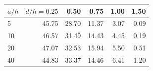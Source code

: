 \begin{tabularx}{\linewidth}{Xrrrrr}
\toprule
$a/h$ & $d/h=0.25$ & 0.50 & 0.75 & 1.00 & 1.50 \\
\midrule
5 & 45.75 & 28.70 & 11.37 & 3.07 & 0.09 \\
10 & 46.57 & 31.49 & 14.43 & 4.45 & 0.19 \\
20 & 47.07 & 32.53 & 15.94 & 5.50 & 0.51 \\
40 & 44.83 & 33.37 & 14.46 & 6.41 & 1.20 \\
\bottomrule
\end{tabularx}
